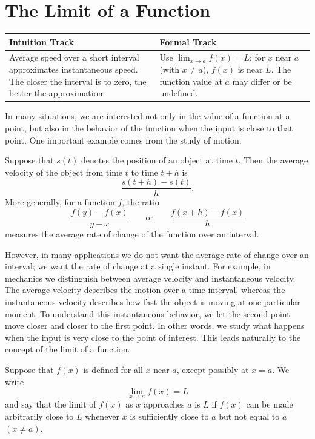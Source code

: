 \section{The Limit of a Function}

\begin{center}
\renewcommand{\arraystretch}{1.2}
\begin{tabular}{|p{}|p{}|}
\hline
\textbf{Intuition Track} & \textbf{Formal Track} \\
\hline
Average speed over a short interval approximates instantaneous speed. The closer the interval is to zero, the better the approximation. & Use \(\lim_{x\to a}f(x)=L\): for \(x\) near \(a\) (with \(x\ne a\)), \(f(x)\) is near \(L\). The function value at \(a\) may differ or be undefined. \\
\hline
\end{tabular}
\end{center}

In many situations, we are interested not only in the value of a function at a point, but also in the behavior of the function when the input is close to that point. One important example comes from the study of motion.

Suppose that \(s(t)\) denotes the position of an object at time \(t\). Then the average velocity of the object from time \(t\) to time \(t+h\) is
\[
\frac{s(t+h)-s(t)}{h}.
\]
More generally, for a function \(f\), the ratio
\[
\frac{f(y)-f(x)}{y-x}
\qquad \text{or} \qquad
\frac{f(x+h)-f(x)}{h}
\]
measures the average rate of change of the function over an interval.

However, in many applications we do not want the average rate of change over an interval; we want the rate of change at a single instant. For example, in mechanics we distinguish between average velocity and instantaneous velocity. The average velocity describes the motion over a time interval, whereas the instantaneous velocity describes how fast the object is moving at one particular moment. To understand this instantaneous behavior, we let the second point move closer and closer to the first point. In other words, we study what happens when the input is very close to the point of interest. This leads naturally to the concept of the limit of a function.

\begin{definition}
Suppose that \(f(x)\) is defined for all \(x\) near \(a\), except possibly at \(x=a\). We write
\[
\lim_{x\to a} f(x)=L
\]
and say that the limit of \(f(x)\) as \(x\) approaches \(a\) is \(L\) if \(f(x)\) can be made arbitrarily close to \(L\) whenever \(x\) is sufficiently close to \(a\) but not equal to \(a\) \((x\ne a)\).
\end{definition}

